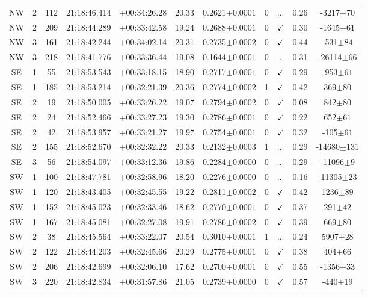 \begin{landscape}
\begin{longtable}{ccccccccccc}
	NW & 2 & 112 & 21:18:46.414 & +00:34:26.28 & 20.33 & 0.2621$\pm{0.0001}$ & 0 & ... & 0.26 & -3217$\pm{70}$ \\
	NW & 2 & 209 & 21:18:44.289 & +00:33:42.58 & 19.24 & 0.2688$\pm{0.0001}$ & 0 & $\checkmark$ & 0.30 & -1645$\pm{61}$ \\
	NW & 3 & 161 & 21:18:42.244 & +00:34:02.14 & 20.31 & 0.2735$\pm{0.0002}$ & 0 & $\checkmark$ & 0.44 & -531$\pm{84}$ \\
	NW & 3 & 218 & 21:18:41.776 & +00:33:36.44 & 19.08 & 0.1644$\pm{0.0001}$ & 0 & ... & 0.31 & -26114$\pm{66}$ \\
	SE & 1 & 55 & 21:18:53.543 & +00:33:18.15 & 18.90 & 0.2717$\pm{0.0001}$ & 0 & $\checkmark$ & 0.29 & -953$\pm{61}$ \\
	SE & 1 & 185 & 21:18:53.214 & +00:32:21.39 & 20.36 & 0.2774$\pm{0.0002}$ & 1 & $\checkmark$ & 0.42 & 369$\pm{80}$ \\
	SE & 2 & 19 & 21:18:50.005 & +00:33:26.22 & 19.07 & 0.2794$\pm{0.0002}$ & 0 & $\checkmark$ & 0.08 & 842$\pm{80}$ \\
	SE & 2 & 24 & 21:18:52.466 & +00:33:27.23 & 19.30 & 0.2786$\pm{0.0001}$ & 0 & $\checkmark$ & 0.22 & 652$\pm{61}$ \\
	SE & 2 & 42 & 21:18:53.957 & +00:33:21.27 & 19.97 & 0.2754$\pm{0.0001}$ & 0 & $\checkmark$ & 0.32 & -105$\pm{61}$ \\
	SE & 2 & 155 & 21:18:52.670 & +00:32:32.22 & 20.33 & 0.2132$\pm{0.0003}$ & 1 & ... & 0.29 & -14680$\pm{131}$ \\
	SE & 3 & 56 & 21:18:54.097 & +00:33:12.36 & 19.86 & 0.2284$\pm{0.0000}$ & 0 & ... & 0.29 & -11096$\pm{9}$ \\
	SW & 1 & 100 & 21:18:47.781 & +00:32:58.96 & 18.20 & 0.2276$\pm{0.0000}$ & 0 & ... & 0.16 & -11305$\pm{23}$ \\
	SW & 1 & 120 & 21:18:43.405 & +00:32:45.55 & 19.22 & 0.2811$\pm{0.0002}$ & 0 & $\checkmark$ & 0.42 & 1236$\pm{89}$ \\
	SW & 1 & 152 & 21:18:45.023 & +00:32:33.46 & 18.62 & 0.2770$\pm{0.0001}$ & 0 & $\checkmark$ & 0.37 & 291$\pm{42}$ \\
	SW & 1 & 167 & 21:18:45.081 & +00:32:27.08 & 19.91 & 0.2786$\pm{0.0002}$ & 0 & $\checkmark$ & 0.39 & 669$\pm{80}$ \\
	SW & 2 & 38 & 21:18:45.564 & +00:33:22.07 & 20.54 & 0.3010$\pm{0.0001}$ & 1 & ... & 0.24 & 5907$\pm{28}$ \\
	SW & 2 & 122 & 21:18:44.203 & +00:32:45.66 & 20.29 & 0.2775$\pm{0.0001}$ & 0 & $\checkmark$ & 0.38 & 404$\pm{66}$ \\
	SW & 2 & 206 & 21:18:42.699 & +00:32:06.10 & 17.62 & 0.2700$\pm{0.0001}$ & 0 & $\checkmark$ & 0.55 & -1356$\pm{33}$ \\
	SW & 3 & 220 & 21:18:42.834 & +00:31:57.86 & 21.05 & 0.2739$\pm{0.0000}$ & 0 & $\checkmark$ & 0.57 & -440$\pm{19}$ \\
			\hline
		\label{2tbl:VCSJ211849.1+003337.3}
	\end{longtable}
\end{landscape}


